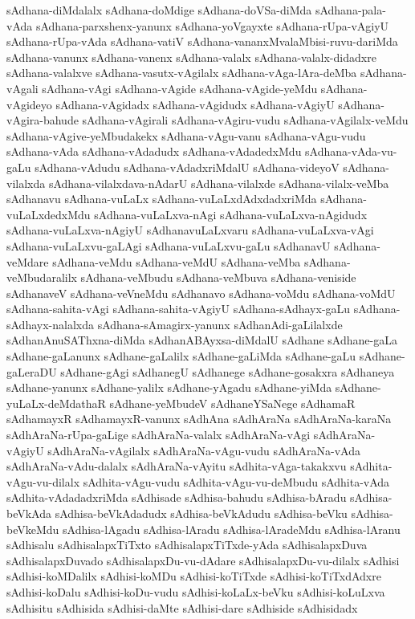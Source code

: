 {sAdhana-diMdalalx
sAdhana-doMdige
sAdhana-doVSa-diMda
sAdhana-pala-vAda
sAdhana-parxshenx-yanunx
sAdhana-yoVgayxte
sAdhana-rUpa-vAgiyU
sAdhana-rUpa-vAda
sAdhana-vatiV
sAdhana-vananxMvalaMbisi-ruvu-dariMda
sAdhana-vanunx
sAdhana-vanenx
sAdhana-valalx
sAdhana-valalx-didadxre
sAdhana-valalxve
sAdhana-vasutx-vAgilalx
sAdhana-vAga-lAra-deMba
sAdhana-vAgali
sAdhana-vAgi
sAdhana-vAgide
sAdhana-vAgide-yeMdu
sAdhana-vAgideyo
sAdhana-vAgidadx
sAdhana-vAgidudx
sAdhana-vAgiyU
sAdhana-vAgira-bahude
sAdhana-vAgirali
sAdhana-vAgiru-vudu
sAdhana-vAgilalx-veMdu
sAdhana-vAgive-yeMbudakekx
sAdhana-vAgu-vanu
sAdhana-vAgu-vudu
sAdhana-vAda
sAdhana-vAdadudx
sAdhana-vAdadedxMdu
sAdhana-vAda-vu-gaLu
sAdhana-vAdudu
sAdhana-vAdadxriMdalU
sAdhana-videyoV
sAdhana-vilalxda
sAdhana-vilalxdava-nAdarU
sAdhana-vilalxde
sAdhana-vilalx-veMba
sAdhanavu
sAdhana-vuLaLx
sAdhana-vuLaLxdAdxdadxriMda
sAdhana-vuLaLxdedxMdu
sAdhana-vuLaLxva-nAgi
sAdhana-vuLaLxva-nAgidudx
sAdhana-vuLaLxva-nAgiyU
sAdhanavuLaLxvaru
sAdhana-vuLaLxva-vAgi
sAdhana-vuLaLxvu-gaLAgi
sAdhana-vuLaLxvu-gaLu
sAdhanavU
sAdhana-veMdare
sAdhana-veMdu
sAdhana-veMdU
sAdhana-veMba
sAdhana-veMbudaralilx
sAdhana-veMbudu
sAdhana-veMbuva
sAdhana-veniside
sAdhanaveV
sAdhana-veVneMdu
sAdhanavo
sAdhana-voMdu
sAdhana-voMdU
sAdhana-sahita-vAgi
sAdhana-sahita-vAgiyU
sAdhana-sAdhayx-gaLu
sAdhana-sAdhayx-nalalxda
sAdhana-sAmagirx-yanunx
sAdhanAdi-gaLilalxde
sAdhanAnuSAThxna-diMda
sAdhanABAyxsa-diMdalU
sAdhane
sAdhane-gaLa
sAdhane-gaLanunx
sAdhane-gaLalilx
sAdhane-gaLiMda
sAdhane-gaLu
sAdhane-gaLeraDU
sAdhane-gAgi
sAdhanegU
sAdhanege
sAdhane-gosakxra
sAdhaneya
sAdhane-yanunx
sAdhane-yalilx
sAdhane-yAgadu
sAdhane-yiMda
sAdhane-yuLaLx-deMdathaR
sAdhane-yeMbudeV
sAdhaneYSaNege
sAdhamaR
sAdhamayxR
sAdhamayxR-vanunx
sAdhAna
sAdhAraNa
sAdhAraNa-karaNa
sAdhAraNa-rUpa-gaLige
sAdhAraNa-valalx
sAdhAraNa-vAgi
sAdhAraNa-vAgiyU
sAdhAraNa-vAgilalx
sAdhAraNa-vAgu-vudu
sAdhAraNa-vAda
sAdhAraNa-vAdu-dalalx
sAdhAraNa-vAyitu
sAdhita-vAga-takakxvu
sAdhita-vAgu-vu-dilalx
sAdhita-vAgu-vudu
sAdhita-vAgu-vu-deMbudu
sAdhita-vAda
sAdhita-vAdadadxriMda
sAdhisade
sAdhisa-bahudu
sAdhisa-bAradu
sAdhisa-beVkAda
sAdhisa-beVkAdadudx
sAdhisa-beVkAdudu
sAdhisa-beVku
sAdhisa-beVkeMdu
sAdhisa-lAgadu
sAdhisa-lAradu
sAdhisa-lAradeMdu
sAdhisa-lAranu
sAdhisalu
sAdhisalapxTiTxto
sAdhisalapxTiTxde-yAda
sAdhisalapxDuva
sAdhisalapxDuvado
sAdhisalapxDu-vu-dAdare
sAdhisalapxDu-vu-dilalx
sAdhisi
sAdhisi-koMDalilx
sAdhisi-koMDu
sAdhisi-koTiTxde
sAdhisi-koTiTxdAdxre
sAdhisi-koDalu
sAdhisi-koDu-vudu
sAdhisi-koLaLx-beVku
sAdhisi-koLuLxva
sAdhisitu
sAdhisida
sAdhisi-daMte
sAdhisi-dare
sAdhiside
sAdhisidadx
}
